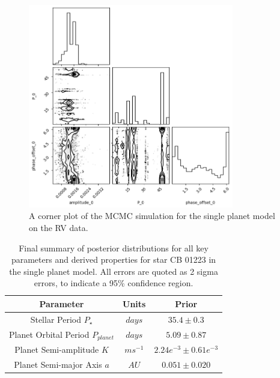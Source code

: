\begin{figure}[htb]
    \centering
    \includegraphics[width=0.8\textwidth]{figures/1planet_model_corner_plot}
    \caption{A corner plot of the MCMC simulation for the single planet model on the RV data.}
    \label{fig:1planet_model_corner_plot}
\end{figure}

\begin{table}[htb]
    \centering
    \begin{tabular}{ccc}
        \toprule
        \toprule
        Parameter & Units & Prior \\
        \midrule
        Stellar Period $P_{\star}$ & $days$ & $35.4 \pm 0.3$ \\
        \addlinespace
        Planet Orbital Period $P_{planet}$ & $days$ & $5.09 \pm 0.87$  \\
        \addlinespace
        Planet Semi-amplitude $K$ & $ms^{-1}$ & $2.24e^{-3} \pm 0.61e^{-3}$ \\
        \addlinespace
        Planet Semi-major Axis $a$ & $AU$ & $0.051 \pm 0.020$ \\
        \bottomrule
    \end{tabular}
    \caption{Final summary of posterior distributions for all key parameters and derived properties for star CB 01223
    in the single planet model. All errors are quoted as 2 sigma errors, to indicate a 95\% confidence region.}
    \label{tab:final_posteriors}
\end{table}
